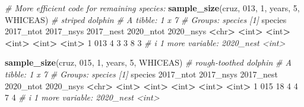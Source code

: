 \documentclass[
]{book}
\newenvironment{Shaded}{\begin{snugshade}}{\end{snugshade}}
\newcommand{\AttributeTok}[1]{\textcolor[rgb]{0.13,0.29,0.53}{#1}}
\newcommand{\CommentTok}[1]{\textcolor[rgb]{0.56,0.35,0.01}{\textit{#1}}}
\newcommand{\DecValTok}[1]{\textcolor[rgb]{0.00,0.00,0.81}{#1}}
\newcommand{\ErrorTok}[1]{\textcolor[rgb]{0.64,0.00,0.00}{\textbf{#1}}}
\newcommand{\FunctionTok}[1]{\textcolor[rgb]{0.13,0.29,0.53}{\textbf{#1}}}
\newcommand{\NormalTok}[1]{#1}
\newcommand{\SpecialCharTok}[1]{\textcolor[rgb]{0.81,0.36,0.00}{\textbf{#1}}}
\newcommand{\StringTok}[1]{\textcolor[rgb]{0.31,0.60,0.02}{#1}}
\begin{document}
\begin{Shaded}
\begin{Highlighting}[]
\CommentTok{\# More efficient code for remaining species: }
\FunctionTok{sample\_size}\NormalTok{(cruz, }\StringTok{\textquotesingle{}013\textquotesingle{}}\NormalTok{, }\DecValTok{1}\NormalTok{, years, }\DecValTok{5}\NormalTok{, }\StringTok{\textquotesingle{}WHICEAS\textquotesingle{}}\NormalTok{) }\CommentTok{\# striped dolphin}
\CommentTok{\# A tibble: 1 x 7}
\CommentTok{\# Groups:   species [1]}
\NormalTok{  species }\StringTok{\textasciigrave{}}\AttributeTok{2017\_ntot}\StringTok{\textasciigrave{}} \StringTok{\textasciigrave{}}\AttributeTok{2017\_nsys}\StringTok{\textasciigrave{}} \StringTok{\textasciigrave{}}\AttributeTok{2017\_nest}\StringTok{\textasciigrave{}} \StringTok{\textasciigrave{}}\AttributeTok{2020\_ntot}\StringTok{\textasciigrave{}} \StringTok{\textasciigrave{}}\AttributeTok{2020\_nsys}\StringTok{\textasciigrave{}}
  \SpecialCharTok{\textless{}}\NormalTok{chr}\SpecialCharTok{\textgreater{}}         \ErrorTok{\textless{}}\NormalTok{int}\SpecialCharTok{\textgreater{}}       \ErrorTok{\textless{}}\NormalTok{int}\SpecialCharTok{\textgreater{}}       \ErrorTok{\textless{}}\NormalTok{int}\SpecialCharTok{\textgreater{}}       \ErrorTok{\textless{}}\NormalTok{int}\SpecialCharTok{\textgreater{}}       \ErrorTok{\textless{}}\NormalTok{int}\SpecialCharTok{\textgreater{}}
\DecValTok{1} \DecValTok{013}               \DecValTok{4}           \DecValTok{3}           \DecValTok{3}           \DecValTok{8}           \DecValTok{3}
\CommentTok{\# i 1 more variable: \textasciigrave{}2020\_nest\textasciigrave{} \textless{}int\textgreater{}}

\FunctionTok{sample\_size}\NormalTok{(cruz, }\StringTok{\textquotesingle{}015\textquotesingle{}}\NormalTok{, }\DecValTok{1}\NormalTok{, years, }\DecValTok{5}\NormalTok{, }\StringTok{\textquotesingle{}WHICEAS\textquotesingle{}}\NormalTok{) }\CommentTok{\# rough{-}toothed dolphin}
\CommentTok{\# A tibble: 1 x 7}
\CommentTok{\# Groups:   species [1]}
\NormalTok{  species }\StringTok{\textasciigrave{}}\AttributeTok{2017\_ntot}\StringTok{\textasciigrave{}} \StringTok{\textasciigrave{}}\AttributeTok{2017\_nsys}\StringTok{\textasciigrave{}} \StringTok{\textasciigrave{}}\AttributeTok{2017\_nest}\StringTok{\textasciigrave{}} \StringTok{\textasciigrave{}}\AttributeTok{2020\_ntot}\StringTok{\textasciigrave{}} \StringTok{\textasciigrave{}}\AttributeTok{2020\_nsys}\StringTok{\textasciigrave{}}
  \SpecialCharTok{\textless{}}\NormalTok{chr}\SpecialCharTok{\textgreater{}}         \ErrorTok{\textless{}}\NormalTok{int}\SpecialCharTok{\textgreater{}}       \ErrorTok{\textless{}}\NormalTok{int}\SpecialCharTok{\textgreater{}}       \ErrorTok{\textless{}}\NormalTok{int}\SpecialCharTok{\textgreater{}}       \ErrorTok{\textless{}}\NormalTok{int}\SpecialCharTok{\textgreater{}}       \ErrorTok{\textless{}}\NormalTok{int}\SpecialCharTok{\textgreater{}}
\DecValTok{1} \DecValTok{015}              \DecValTok{18}           \DecValTok{4}           \DecValTok{4}           \DecValTok{7}           \DecValTok{4}
\CommentTok{\# i 1 more variable: \textasciigrave{}2020\_nest\textasciigrave{} \textless{}int\textgreater{}}


\end{Highlighting}
\end{Shaded}
\end{document}
